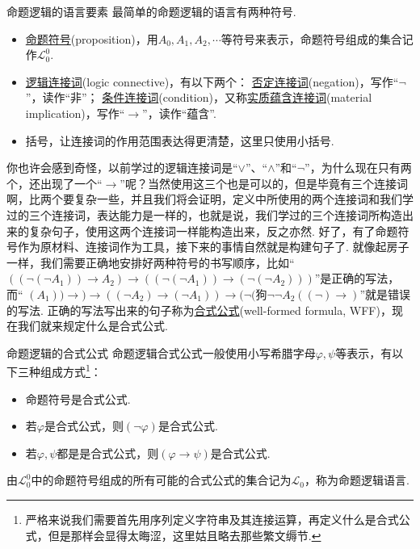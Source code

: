 \begin{definition}{命题逻辑的语言要素}
    最简单的命题逻辑的语言有两种符号. 
    \begin{itemize}
        \item \underline{命题符号}(proposition)，用\(A_0, A_1, A_2, \cdots\)等符号来表示，命题符号组成的集合记作\(\mathcal{L}_0^0\).
        \item \underline{逻辑连接词}(logic connective)，有以下两个：\newline
            \underline{否定连接词}(negation)，写作“\(\neg\)”，读作“非”；\newline
            \underline{条件连接词}(condition)，又称\underline{实质蕴含连接词}(material implication)，写作“\(\to\)”，读作“蕴含”.
        \item 括号，让连接词的作用范围表达得更清楚，这里只使用小括号.
    \end{itemize}
\end{definition}

你也许会感到奇怪，以前学过的逻辑连接词是“\(\vee\)”、“\(\wedge\)”和“\(\neg\)”，为什么现在只有两个，还出现了一个“\(\to\)”呢？当然使用这三个也是可以的，但是毕竟有三个连接词啊，比两个要复杂一些，并且我们将会证明，定义中所使用的两个连接词和我们学过的三个连接词，表达能力是一样的，也就是说，我们学过的三个连接词所构造出来的复杂句子，使用这两个连接词一样能构造出来，反之亦然. 好了，有了命题符号作为原材料、连接词作为工具，接下来的事情自然就是构建句子了. 就像起房子一样，我们需要正确地安排好两种符号的书写顺序，比如“{\color{blue} \(((\neg(\neg A_1)) \to A_2) \to ((\neg(\neg A_1)) \to (\neg(\neg A_2)))\)}”是正确的写法，而“{\color{red} \((A_1)) \to ) \to ((\neg A_2) \to (\neg A_1)) \to (\neg(\mbox{狗}\neg\neg A_2 ((\neg ) \to)\)}”就是错误的写法. 正确的写法写出来的句子称为\underline{合式公式}(well-formed formula, WFF)，现在我们就来规定什么是合式公式.

\begin{definition}{命题逻辑的合式公式}
    命题逻辑合式公式一般使用小写希腊字母\(\varphi, \psi\)等表示，有以下三种组成方式\footnote{严格来说我们需要首先用序列定义字符串及其连接运算，再定义什么是合式公式，但是那样会显得太晦涩，这里姑且略去那些繁文缛节.}：
    \begin{itemize}
        \item 命题符号是合式公式. 
        \item 若\(\varphi\)是合式公式，则\((\neg \varphi)\)是合式公式.
        \item 若\(\varphi, \psi\)都是是合式公式，则\((\varphi \to \psi)\)是合式公式.
    \end{itemize}
    由\(\mathcal{L}_0^0\)中的命题符号组成的所有可能的合式公式的集合记为\(\mathcal{L}_0\)，称为命题逻辑语言.
\end{definition}

